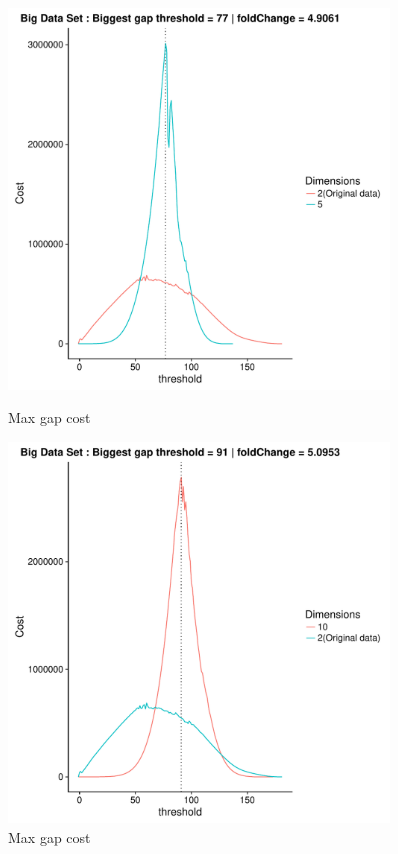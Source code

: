 \documentclass[a4paper,10pt]{article}
\theoremstyle{plain}
\theoremstyle{definition}
\begin{document}
\begin{figure}[H]
	\centering
	\begin{minipage}{0.75\textwidth}
		\centering
		\includegraphics[width=0.9\textwidth]{./plots/plotsCostAndSimAp234/plotBigDataCostAndSim-AP2-S7-K5.pdf}
		\caption{Max gap cost}
		\label{fig:maxGapCostBigDataAp2K5}
	\end{minipage}
	\begin{minipage}{0.75\textwidth}
		\centering
		\includegraphics[width=0.9\textwidth]{./plots/plotsCostAndSimAp234/plotBigDataCostAndSim-AP2-S7-K10.pdf}
		\caption{Max gap cost}
		\label{fig:maxGapCostBigDataAp2K10}
	\end{minipage}
\end{figure}
\end{document}
